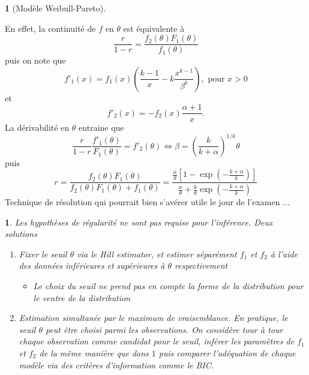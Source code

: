 \documentclass[8pt,notheorems]{beamer}
\newtheorem{remark}{\translate{Remark}}
\theoremstyle{definition}
\theoremstyle{example}
\newtheorem{example}{\translate{Example}}
\theoremstyle{mystyle}
\theoremstyle{plain}
\begin{document}
\begin{frame}[allowframebreaks]
\begin{example}[Modèle Weibull-Pareto]
$$$$
\end{example}
En effet, la continuité de $f$ en $\theta$ est équivalente à
$$
\frac{r}{1-r} = \frac{f_2(\theta)F_1(\theta)}{f_1(\theta)}
$$
puis on note que
$$
f'_1(x) =f_1(x)\left(\frac{k-1}{x}-k\frac{x^{k-1}}{\beta^k}\right), \text{ pour }x>0
$$
et
$$
f'_2(x) = -f_2(x)\frac{\alpha+1}{x}.
$$
La dérivabilité en $\theta$ entraine que
$$
\frac{r}{1-r}\frac{f'_1(\theta)}{F_1(\theta)} = f'_2(\theta)\Leftrightarrow \beta = \left(\frac{k}{k+\alpha}\right)^{1/k}\theta
$$
puis
$$
r = \frac{f_2(\theta)F_1(\theta)}{f_2(\theta)F_1(\theta)+f_1(\theta)} = \frac{\frac{\alpha}{\theta}\left[1-\exp\left(-\frac{k+\alpha}{k}\right)\right]}{\frac{\alpha}{\theta}+\frac{k}{\theta}\exp\left(-\frac{k+\alpha}{k}\right)}
$$
Technique de résolution qui pourrait bien s'avérer utile le jour de l'examen ...
\begin{remark}
Les hypothèses de régularité ne sont pas requise pour l'inférence. Deux solutions
\begin{enumerate}
    \item Fixer le seuil $\theta$ via le Hill estimator, et estimer séparément $f_1$ et $f_2$ à l'aide des données inférieures et supérieures à $\theta$ respectivement
    \begin{itemize}
        \item[$\hookrightarrow$] Le choix du seuil ne prend pas en compte la forme de la distribution pour le ventre de la distribution
    \end{itemize}
    \item Estimation simultanée par le maximum de vraisemblance. En pratique, le seuil $\theta$ peut être choisi parmi les observations. On considère tour à tour chaque observation comme candidat pour le seuil, inférer les paramètres de $f_1$ et $f_2$ de la même manière que dans $1$ puis comparer l'adéquation de chaque modèle via des critères d'information comme le BIC.
\end{enumerate}
\end{remark}
\end{frame}
\end{document}
